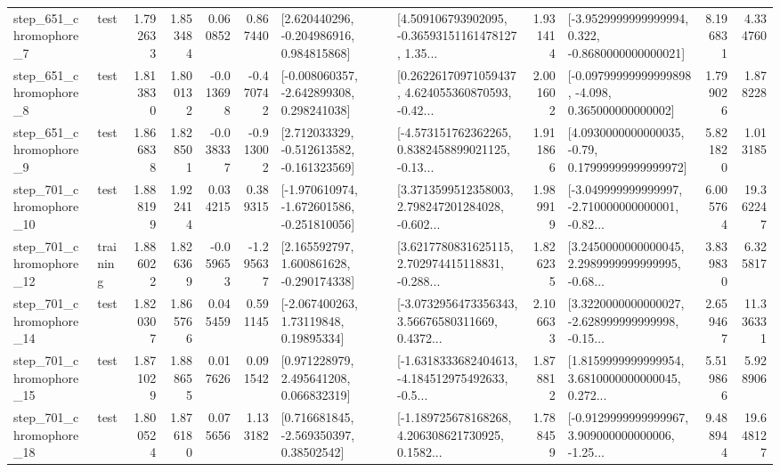 \begin{tabular}{llrrrrllrlrr}
   step\_651\_chromophore\_7 &      test &      1.792633 &    1.853484 &      0.060852 &  0.867440 &    [2.620440296, -0.204986916, 0.984815868] &  [4.509106793902095, -0.36593151161478127, 1.35... &       1.931414 &  [-3.9529999999999994, 0.322, -0.8680000000000021] &            8.196831 &          4.334760 \\
   step\_651\_chromophore\_8 &      test &      1.813830 &    1.800132 &     -0.013698 & -0.470742 &   [-0.008060357, -2.642899308, 0.298241038] &  [0.26226170971059437, 4.624055360870593, -0.42... &       2.001602 &  [-0.09799999999999898, -4.098, 0.365000000000002] &            1.799026 &          1.878228 \\
   step\_651\_chromophore\_9 &      test &      1.866838 &    1.828501 &     -0.038337 & -0.913002 &   [2.712033329, -0.512613582, -0.161323569] &  [-4.573151762362265, 0.8382458899021125, -0.13... &       1.911866 &   [4.0930000000000035, -0.79, 0.17999999999999972] &            5.821820 &          1.013185 \\
  step\_701\_chromophore\_10 &      test &      1.888199 &    1.922414 &      0.034215 &  0.389315 &  [-1.970610974, -1.672601586, -0.251810056] &  [3.3713599512358003, 2.798247201284028, -0.602... &       1.989919 &  [-3.049999999999997, -2.710000000000001, -0.82... &            6.005764 &         19.362247 \\
  step\_701\_chromophore\_12 &  training &      1.886022 &    1.826369 &     -0.059653 & -1.295637 &    [2.165592797, 1.600861628, -0.290174338] &  [3.6217780831625115, 2.702974415118831, -0.288... &       1.826235 &  [3.2450000000000045, 2.2989999999999995, -0.68... &            3.839830 &          6.325817 \\
  step\_701\_chromophore\_14 &      test &      1.820307 &    1.865766 &      0.045459 &  0.591145 &      [-2.067400263, 1.73119848, 0.19895334] &  [-3.0732956473356343, 3.56676580311669, 0.4372... &       2.106633 &  [3.3220000000000027, -2.628999999999998, -0.15... &            2.659467 &         11.336331 \\
  step\_701\_chromophore\_15 &      test &      1.871029 &    1.888655 &      0.017626 &  0.091542 &     [0.971228979, 2.495641208, 0.066832319] &  [-1.6318333682404613, -4.184512975492633, -0.5... &       1.878812 &  [1.8159999999999954, 3.6810000000000045, 0.272... &            5.519866 &          5.928906 \\
  step\_701\_chromophore\_18 &      test &      1.800524 &    1.876180 &      0.075656 &  1.133182 &     [0.716681845, -2.569350397, 0.38502542] &  [-1.189725678168268, 4.206308621730925, 0.1582... &       1.788459 &  [-0.9129999999999967, 3.909000000000006, -1.25... &            9.488944 &         19.648127 \\

\end{tabular}
